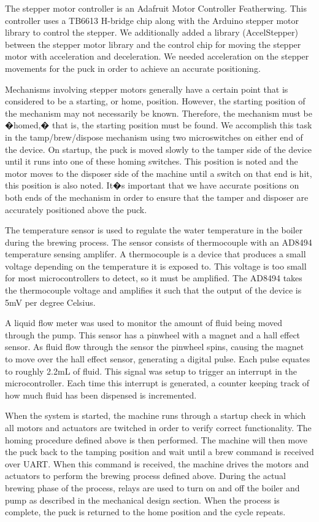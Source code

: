 \documentclass[conference]{IEEEtran}
\begin{document}
The stepper motor controller is an Adafruit Motor Controller
Featherwing. This controller uses a TB6613 H-bridge chip
along with the Arduino stepper motor library to control
the stepper. We additionally added a library (AccelStepper)
between the stepper motor library and the control chip for
moving the stepper motor with acceleration and deceleration.
We needed acceleration on the stepper movements for the puck
in order to achieve an accurate positioning.

Mechanisms involving stepper motors generally have a
certain point that is considered to be a starting, or home,
position. However, the starting position of the mechanism
may not necessarily be known. Therefore, the mechanism
must be �homed,� that is, the starting position must be found.
We accomplish this task in the tamp/brew/dispose mechanism
using two microswitches on either end of the device. On
startup, the puck is moved slowly to the tamper side of the
device until it runs into one of these homing switches. This
position is noted and the motor moves to the disposer side of
the machine until a switch on that end is hit, this position is
also noted. It�s important that we have accurate positions on
both ends of the mechanism in order to ensure that the tamper
and disposer are accurately positioned above the puck.

The temperature sensor is used to regulate the water temperature
in the boiler during the brewing process. The sensor
consists of thermocouple with an AD8494 temperature sensing
amplifer. A thermocouple is a device that produces a small
voltage depending on the temperature it is exposed to. This
voltage is too small for most microcontrollers to detect, so
it must be amplified. The AD8494 takes the thermocouple
voltage and amplifies it such that the output of the device is
5mV per degree Celsius.

A liquid flow meter was used to monitor the amount of fluid
being moved through the pump. This sensor has a pinwheel
with a magnet and a hall effect sensor. As fluid flow through
the sensor the pinwheel spins, causing the magnet to move
over the hall effect sensor, generating a digital pulse. Each
pulse equates to roughly 2.2mL of fluid. This signal was setup
to trigger an interrupt in the microcontroller. Each time this
interrupt is generated, a counter keeping track of how much
fluid has been dispensed is incremented.

When the system is started, the machine runs through a
startup check in which all motors and actuators are twitched
in order to verify correct functionality. The homing procedure
defined above is then performed. The machine will then move
the puck back to the tamping position and wait until a brew
command is received over UART. When this command is
received, the machine drives the motors and actuators to
perform the brewing process defined above. During the actual
brewing phase of the process, relays are used to turn on and
off the boiler and pump as described in the mechanical design
section. When the process is complete, the puck is returned to
the home position and the cycle repeats.
\end{document}
